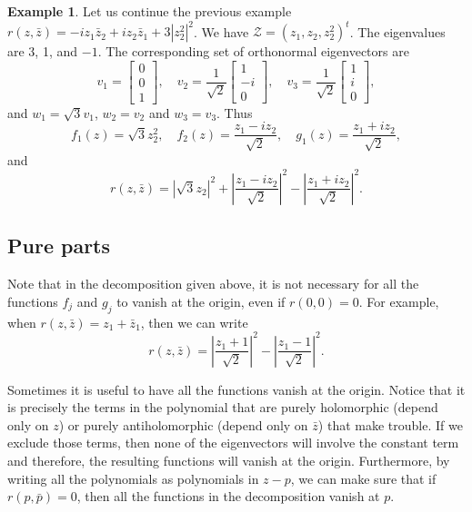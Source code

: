 \documentclass[12pt,openany]{book}
\newcommand{\abs}[1]{\left\lvert {#1} \right\rvert}
\newcommand{\sZ}{{\mathcal{Z}}}
\theoremstyle{plain}
\theoremstyle{remark}
\theoremstyle{definition}
\theoremstyle{exercise}
\theoremstyle{example}
\newtheorem{example}[thm]{Example}
\begin{document}
\begin{example}
Let us continue the previous example
$r(z,\bar{z}) = - i z_1 \bar{z}_2 + i z_2 \bar{z}_1 + 3 \abs{z_2^2}^2$.
We have $\sZ = {(z_1,z_2,z_2^2)}^t$.
The eigenvalues are 3, 1, and $-1$.  The corresponding
set of orthonormal eigenvectors are
\begin{equation}
v_1 =
\begin{bmatrix}
0 \\ 0 \\ 1
\end{bmatrix}
,
\quad
v_2 =
\frac{1}{\sqrt{2}}
\begin{bmatrix}
1 \\ -i \\ 0
\end{bmatrix}
,
\quad
v_3 =
\frac{1}{\sqrt{2}}
\begin{bmatrix}
1 \\ i \\ 0
\end{bmatrix}
,
\end{equation}
and $w_1 = \sqrt{3} v_1$, $w_2 = v_2$ and $w_3 = v_3$.  Thus
\begin{equation}
f_1(z) = \sqrt{3} z_2^2, \quad
f_2(z) = \frac{z_1-iz_2}{\sqrt{2}}, \quad
g_1(z) = \frac{z_1+iz_2}{\sqrt{2}} ,
\end{equation}
and
\begin{equation}
r(z,\bar{z})
=
\abs{\sqrt{3} z_2}^2 +
\abs{\frac{z_1-iz_2}{\sqrt{2}}}^2
-
\abs{\frac{z_1+iz_2}{\sqrt{2}}}^2.
\end{equation}
\end{example}

\subsection{Pure parts}

Note that in the decomposition given above, it is not necessary for all
the functions $f_j$ and $g_j$ to vanish at the origin, even if $r(0,0) = 0$.
For example, when $r(z,\bar{z}) = z_1 + \bar{z}_1$, then we can write
\begin{equation}
r(z,\bar{z}) =
\abs{\frac{z_1 + 1}{\sqrt{2}}}^2 - 
\abs{\frac{z_1 - 1}{\sqrt{2}}}^2 .
\end{equation}

Sometimes it is useful to have all the functions vanish at the origin.
Notice that it is precisely the terms in the polynomial that are purely
holomorphic (depend only on $z$) or purely antiholomorphic (depend only on
$\bar{z}$) that make trouble.  If we exclude those terms, then none of the
eigenvectors will involve the constant term and therefore, the
resulting functions will vanish at the origin.
Furthermore, by writing all the polynomials as polynomials in $z-p$,
we can make sure that if $r(p, \bar{p}) = 0$,
then all the functions in the decomposition vanish at $p$.
\end{document}
